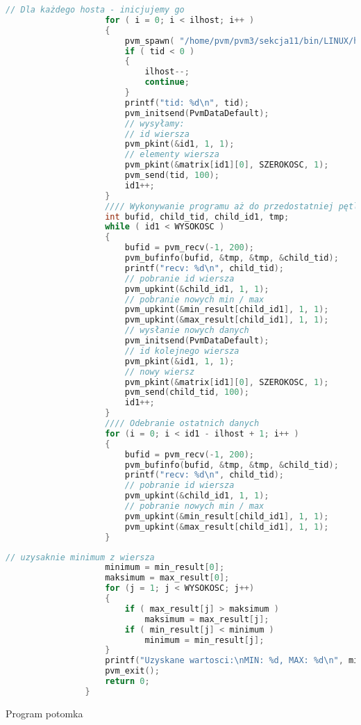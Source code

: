 				\begin{lstlisting}[language={C}]
					// Dla każdego hosta - inicjujemy go
					for ( i = 0; i < ilhost; i++ )
					{
						pvm_spawn( "/home/pvm/pvm3/sekcja11/bin/LINUX/hello_other", 0, PvmTaskHost, info[i].hi_name, 1, &tid);
						if ( tid < 0 )
						{
							ilhost--;
							continue;
						}
						printf("tid: %d\n", tid);
						pvm_initsend(PvmDataDefault);
						// wysyłamy:
						// id wiersza
						pvm_pkint(&id1, 1, 1);
						// elementy wiersza
						pvm_pkint(&matrix[id1][0], SZEROKOSC, 1);
						pvm_send(tid, 100);
						id1++;
					}
					//// Wykonywanie programu aż do przedostatniej pętli
					int bufid, child_tid, child_id1, tmp;
					while ( id1 < WYSOKOSC )
					{
						bufid = pvm_recv(-1, 200);
						pvm_bufinfo(bufid, &tmp, &tmp, &child_tid);
						printf("recv: %d\n", child_tid);
						// pobranie id wiersza
						pvm_upkint(&child_id1, 1, 1);
						// pobranie nowych min / max
						pvm_upkint(&min_result[child_id1], 1, 1);
						pvm_upkint(&max_result[child_id1], 1, 1);
						// wysłanie nowych danych
						pvm_initsend(PvmDataDefault);
						// id kolejnego wiersza
						pvm_pkint(&id1, 1, 1);
						// nowy wiersz
						pvm_pkint(&matrix[id1][0], SZEROKOSC, 1);
						pvm_send(child_tid, 100);
						id1++;
					}
					//// Odebranie ostatnich danych
					for	(i = 0; i < id1 - ilhost + 1; i++ )
					{
						bufid = pvm_recv(-1, 200);
						pvm_bufinfo(bufid, &tmp, &tmp, &child_tid);
						printf("recv: %d\n", child_tid);
						// pobranie id wiersza
						pvm_upkint(&child_id1, 1, 1);
						// pobranie nowych min / max
						pvm_upkint(&min_result[child_id1], 1, 1);
						pvm_upkint(&max_result[child_id1], 1, 1);
					}
				\end{lstlisting}
				\newpage
				\begin{lstlisting}[language={C}]
					// uzysaknie minimum z wiersza
					minimum = min_result[0];
					maksimum = max_result[0];
					for (j = 1; j < WYSOKOSC; j++)
					{
						if ( max_result[j] > maksimum )
							maksimum = max_result[j];
						if ( min_result[j] < minimum )
							minimum = min_result[j];
					}
					printf("Uzyskane wartosci:\nMIN: %d, MAX: %d\n", minimum, maksimum);
					pvm_exit();
					return 0;
				}
			\end{lstlisting}
			Program potomka
